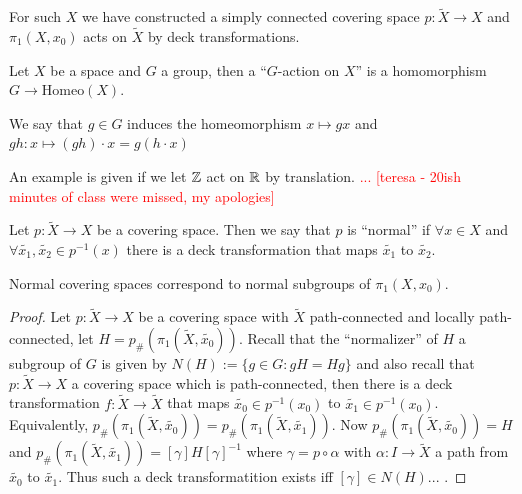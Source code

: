 For such $X$ we have constructed a simply connected covering space $p:\tilde{X}\rightarrow X$ and $\pi_1(X, x_0)$ acts on $\tilde{X}$ by deck transformations.
\begin{boxdefinition}
    Let $X$ be a space and $G$ a group, then a ``$G$-action on $X$'' is a homomorphism $G\rightarrow \text{Homeo}(X)$.
\end{boxdefinition}
\begin{boxnotation}
    We say that $g\in G$ induces the homeomorphism $x\mapsto gx$ and $gh:x\mapsto (gh)\cdot x = g(h\cdot x)$
\end{boxnotation}
An example is given if we let $\mathbb{Z}$ act on $\mathbb{R}$ by translation.
\sorry \textcolor{red}{... [teresa - 20ish minutes of class were missed, my apologies]}
\begin{boxdefinition}
    Let $p:\tilde{X}\rightarrow X$ be a covering space. Then we say that $p$ is ``normal'' if $\forall x\in X$ and $\forall \tilde{x_1}, \tilde{x_2}\in p^{-1}(x)$ there is a deck transformation that maps $\tilde{x_1}$ to $\tilde{x_2}$.
\end{boxdefinition}
\begin{boxproposition}
    Normal covering spaces correspond to normal subgroups of $\pi_1(X, x_0)$.
\end{boxproposition}
\begin{proof}
    Let $p: \tilde{X}\rightarrow X$ be a covering space with $\tilde{X}$ path-connected and locally path-connected, let $H=p_{\#}(\pi_1(\tilde{X}, \tilde{x_0}))$. Recall that the ``normalizer'' of $H$ a subgroup of $G$ is given by $N(H):=\{g\in G: gH=Hg\}$ and also recall that $p:\tilde{X}\rightarrow X$ a covering space which is path-connected, then there is a deck transformation $f:\tilde{X}\rightarrow \tilde{X}$ that maps $\tilde{x_0}\in p^{-1}(x_0)$ to $\tilde{x_1}\in p^{-1}(x_0)$. Equivalently, $p_{\#}(\pi_1(\tilde{X}, \tilde{x_0}))=p_{\#}(\pi_1(\tilde{X}, \tilde{x_1}))$. Now $p_{\#}(\pi_1(\tilde{X}, \tilde{x_0}))=H$ and $p_{\#}(\pi_1(\tilde{X}, \tilde{x_1}))=[\gamma]H[\gamma]^{-1}$ where $\gamma=p\circ \alpha$ with $\alpha:I\rightarrow \tilde{X}$ a path from $\tilde{x_0}$ to $\tilde{x_1}$. Thus such a deck transformatition exists iff $[\gamma]\in N(H)$...\sorry
.\end{proof}


